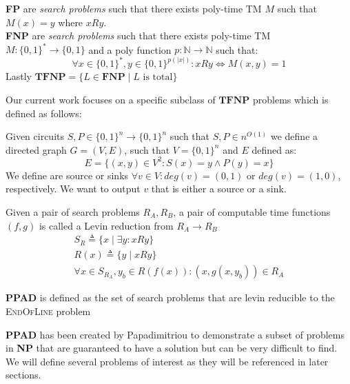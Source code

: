 \begin{definition}
    \textbf{FP} are \textit{search problems} such that there exists poly-time TM $M$
    such that $M(x) = y$ where $x Ry$.\\
    \textbf{FNP} are \textit{search problems} such that there exists poly-time TM $M: \{0,1\}^* \to \{0,1\}$
    and a poly function $p : \mathbb{N} \to \mathbb{N}$ such that:
    $$
    \forall x \in \{0,1\}^*, y \in \{0,1\}^{p(|x|)}: xRy \iff M(x,y) = 1
    $$
    Lastly $\textbf{TFNP} = \{L \in \textbf{FNP} \mid L \text{ is total}\}$
\end{definition}

Our current work focuses on a specific subclass of $\textbf{TFNP}$ problems
which is defined as follows:

\begin{definition}
    Given circuits $S, P \in \{0,1\}^n \to \{0,1\}^n$ such that $S,P \in n^{O(1)}$
    we define a directed graph $G = (V,E)$, such that $V= \{0,1\}^n$ and $E$ defined as:
    $$
    E = \{(x,y) \in V^2: S(x) = y \wedge P(y) = x\}
    $$
    We define are source or sinks $\forall v \in V: \textit{deg}(v) = (0,1)$ or
    $\textit{deg}(v) = (1,0)$, respectively. We want to output
    $v$ that is either a source or a sink.
\end{definition}


\begin{definition}
    Given a pair of search problems $R_A, R_B$, a pair of
    computable time functions $(f,g)$ is called a Levin reduction from $R_A \to R_B$
    \begin{gather*}
        S_R \triangleq \{x \mid \exists y : xRy  \}\\
        R(x) \triangleq \{y \mid x Ry \} \\
        \forall x \in S_{R_A}, y_b \in R(f(x)):  (x , g(x, y_b)) \in R_A
    \end{gather*}
\end{definition}

\begin{definition}
    \textbf{PPAD} is defined as the set of search problems that
    are levin reducible to the \textsc{EndOfLine} problem
\end{definition}


\textbf{PPAD} has been created by Papadimitriou \cite{papadimitriouComplexityParityArgument1994}
to demonstrate a subset of problems in \textbf{NP} that are guaranteed to have
a solution but can be very difficult to find. We will define
several problems of interest as they will be referenced in later sections.

